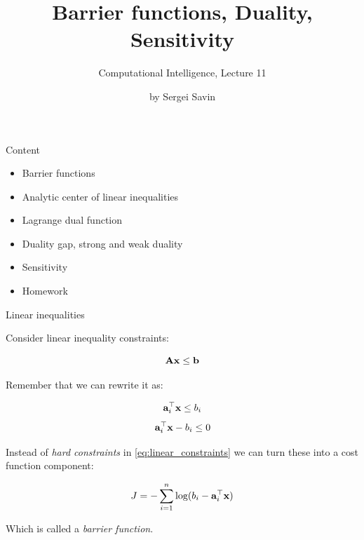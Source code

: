 \documentclass{beamer}
\title{Barrier functions, Duality, Sensitivity}
\subtitle{Computational Intelligence, Lecture 11}
\author{by Sergei Savin}
\date{\mydate}
\begin{document}
\maketitle


\begin{frame}{Content}

\begin{itemize}
\item Barrier functions
\item Analytic center of linear inequalities
\item Lagrange dual function
\item Duality gap, strong and weak duality
\item Sensitivity
\item Homework
\end{itemize}

\end{frame}



\begin{frame}{Linear inequalities}
\begin{flushleft}

Consider linear inequality constraints:

\begin{equation}
    \mathbf{A}\mathbf{x} \leq \mathbf{b}
\end{equation}

Remember that we can rewrite it as:

\begin{equation}
    \mathbf{a}_i^\top \mathbf{x} \leq b_i
\end{equation}
\begin{equation}
\label{eq:linear_constraints}
    \mathbf{a}_i^\top \mathbf{x} - b_i \leq 0
\end{equation}

Instead of \emph{hard constraints} in \eqref{eq:linear_constraints} we can turn these into a cost function component:

\begin{equation}
    J = -\sum\limits_{i = 1}^n \text{log} (b_i - \mathbf{a}_i^\top \mathbf{x})
\end{equation}

Which is called a \emph{barrier function}.
 
\end{flushleft}
\end{frame}
\end{document}
